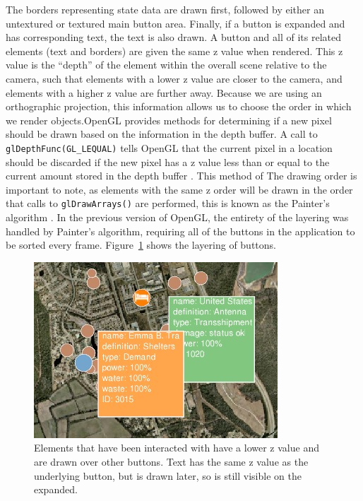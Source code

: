 The borders representing state data are drawn first, followed by either an untextured or textured 
main button area. Finally, if a button is expanded and has corresponding text, the text is 
also drawn. A button and all of its related elements (text and borders) are given the same z value when rendered. This z value is the ``depth'' of the element within the overall scene relative to the camera, such that elements with a lower z value are closer to the camera, and elements with a higher z value are further away. Because we are using an orthographic projection, this information allows us to choose the order in which we render objects.OpenGL provides methods for determining if a
new pixel should be drawn based on the information in the depth buffer. A call to {\tt glDepthFunc(GL\_LEQUAL)} tells OpenGL that the current pixel in a location should be discarded if the new pixel has a z value less than or equal to the current amount stored in the depth buffer \cite{opengl_depth_buffer}. This method of The drawing order is important to note, as elements with the same z order will be drawn in the order that calls to {\tt glDrawArrays()} are performed, this is known
as the Painter's algorithm \cite{Berg1993}. In the previous version of OpenGL, the entirety of the layering was handled by Painter's algorithm, requiring all of the buttons in the application to be sorted every frame. Figure~\ref{fig:layering_buttons} shows the layering of buttons.

\begin{figure}[htp] \centering
    \includegraphics[width=0.8\linewidth]{img/button_layering.jpg}
    \caption[Button Layering]{Elements that have been interacted with have a lower z value and are drawn over other buttons. Text has the same z value as the underlying button, but is drawn later, so is still visible on the expanded.}
    \label{fig:layering_buttons}
\end{figure}

